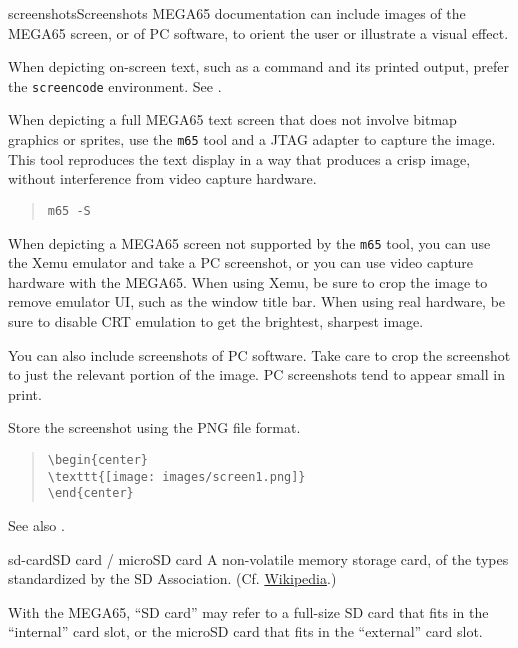 \begin{sgentry}{screenshots}{Screenshots}
    MEGA65 documentation can include images of the MEGA65 screen, or of PC software, to orient the user or illustrate a visual effect.

    When depicting on-screen text, such as a command and its printed output, prefer the \texttt{screencode} environment. See .

    When depicting a full MEGA65 text screen that does not involve bitmap graphics or sprites, use the \texttt{m65} tool and a JTAG adapter to capture the image. This tool reproduces the text display in a way that produces a crisp image, without interference from video capture hardware.

    \begin{quote}
        \texttt{m65 -S}
    \end{quote}

    When depicting a MEGA65 screen not supported by the \texttt{m65} tool, you can use the Xemu emulator and take a PC screenshot, or you can use video capture hardware with the MEGA65. When using Xemu, be sure to crop the image to remove emulator UI, such as the window title bar. When using real hardware, be sure to disable CRT emulation to get the brightest, sharpest image.

    You can also include screenshots of PC software. Take care to crop the screenshot to just the relevant portion of the image. PC screenshots tend to appear small in print.

    Store the screenshot using the PNG file format.

    \begin{quote}
\begin{verbatim}
\begin{center}
\texttt{[image: images/screen1.png]}
\end{center}
\end{verbatim}
    \end{quote}

    See also .
\end{sgentry}

\begin{sgentry}{sd-card}{SD card / microSD card}
    A non-volatile memory storage card, of the types standardized by the SD Association. (Cf. \href{https://en.wikipedia.org/wiki/SD_card}{Wikipedia}.)

    With the MEGA65, ``SD card'' may refer to a full-size SD card that fits in the ``internal'' card slot, or the microSD card that fits in the ``external'' card slot.
\end{sgentry}

